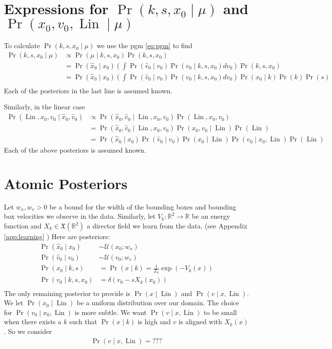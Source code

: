 \documentclass[12pt]{amsart}
\DeclareMathOperator{\Lin}{Lin}
\begin{document}
\section{Expressions for $\Pr( k,s,x_0 \mid \mu)$ and $\Pr( x_0, v_0, \Lin \mid \mu)$}
To calculate $\Pr(k,s,x_0 \mid \mu )$ we use the pgm \eqref{eq:pgm} to find
\begin{align*}
	\Pr( k,s,x_0 \mid \mu ) &\propto \Pr( \mu \mid k,s,x_0) \Pr( k,s,x_0) \\
		&= \Pr( \hat{x}_0 \mid x_0) \left(  \int \Pr( \hat{v}_0 \mid v_0 ) \Pr( v_0 \mid k,s,x_0) dv_0 \right) \Pr(k,s,x_0) \\
		&=  \Pr( \hat{x}_0 \mid x_0) \left(  \int \Pr( \hat{v}_0 \mid v_0 ) \Pr( v_0 \mid k,s,x_0) dv_0 \right) \Pr(x_0 \mid k) \Pr(k) \Pr(s) \\
\end{align*}
Each of the posteriors in the last line is assumed known.

Similarly, in the linear case
\begin{align*}
	\Pr( \Lin , x_0, v_0 \mid \hat{x}_0, \hat{v}_0 ) &\propto \Pr( \hat{x}_0, \hat{v}_0 \mid \Lin, x_0, v_0 ) \Pr( \Lin, x_0, v_0 ) \\
	&= \Pr( \hat{x}_0, \hat{v}_0 \mid \Lin, x_0, v_0 ) \Pr( x_0, v_0 \mid \Lin ) \Pr(\Lin) \\
	&= \Pr( \hat{x}_0 \mid x_0 ) \Pr( \hat{v}_0 \mid v_0 ) \Pr( x_0 \mid \Lin ) \Pr( v_0 \mid x_0, \Lin ) \Pr(\Lin)
\end{align*}
Each of the above posteriors is assumed known.

\appendix

\section{Atomic Posteriors}
Let $w_x, w_v  > 0$ be a bound for the width of the bounding boxes and bounding box velocities we observe in the data.
Similarly, let $V_k: \mathbb{R}^2 \to \mathbb{R}$ be an energy function and $X_k \in \mathfrak{X}( \mathbb{R}^2)$ a director field we learn from the data. (see Appendix \ref{app:learning} )
Here are posteriors:
\begin{align*}
	\Pr( \hat{x}_0 \mid x_0 ) &\sim \mathcal{U}( x_0 ; w_x ) \\
	\Pr( \hat{v}_0 \mid v_0 ) &\sim \mathcal{U}( v_0 ; w_v ) \\
	\Pr( x_0 \mid k,s ) &= \Pr(x \mid k) = \frac{1}{Z_k} \exp \left( -V_k(x) \right) \\
	\Pr( v_0 \mid k,s,x_0) &= \delta( v_0 - s X_k(x_0) ) \\
\end{align*}
The only remaining posterior to provide is $\Pr( x \mid \Lin )$ and $\Pr( v \mid x,\Lin )$.
We let $\Pr( x_0 \mid \Lin)$ be a uniform distribution over our domain.
The choice for $\Pr( v_0 \mid x_0,\Lin)$ is more subtle.
We want $\Pr(v \mid x, \Lin )$ to be small when there exists a $k$ such that $\Pr(x \mid k)$ is high and $v$ is aligned with $X_k(x)$.
So we consider 
\begin{align*}
	\Pr( v \mid x , \Lin ) = ???
\end{align*}
\end{document}
